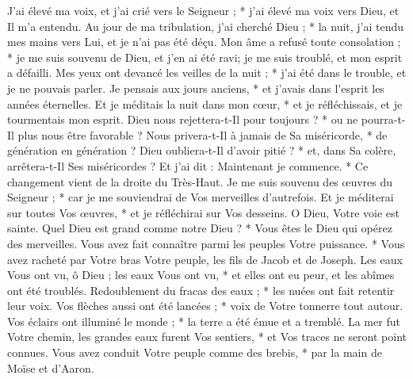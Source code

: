  J'ai élevé ma voix, et j'ai crié vers le Seigneur ; * j'ai élevé ma voix vers Dieu, et Il m'a entendu.
\versseparator
 Au jour de ma tribulation, j'ai cherché Dieu ; * la nuit, j'ai tendu mes mains vers Lui, et je n'ai pas été déçu.
\versseparator
 Mon âme a refusé toute consolation ; * je me suis souvenu de Dieu, et j'en ai été ravi; je me suis troublé, et mon esprit a défailli.
\versseparator
 Mes yeux ont devancé les veilles de la nuit ; * j'ai été dans le trouble, et je ne pouvais parler.
\versseparator
 Je pensais aux jours anciens, * et j'avais dans l'esprit les années éternelles.
\versseparator
 Et je méditais la nuit dans mon cœur, * et je réfléchissais, et je tourmentais mon esprit.
\versseparator
 Dieu nous rejettera-t-Il pour toujours ? * ou ne pourra-t-Il plus nous être favorable ?
\versseparator
 Nous privera-t-Il à jamais de Sa miséricorde, * de génération en génération ?
\versseparator
 Dieu oubliera-t-Il d'avoir pitié ? * et, dans Sa colère, arrêtera-t-Il Ses miséricordes ?
\versseparator
 Et j'ai dit : Maintenant je commence. * Ce changement vient de la droite du Très-Haut.
\versseparator
 Je me suis souvenu des œuvres du Seigneur ; * car je me souviendrai de Vos merveilles d'autrefois.
\versseparator
 Et je méditerai sur toutes Vos œuvres, * et je réfléchirai sur Vos desseins.
\versseparator
 O Dieu, Votre voie est sainte. Quel Dieu est grand comme notre Dieu ? * Vous êtes le Dieu qui opérez des merveilles.
\versseparator
 Vous avez fait connaître parmi les peuples Votre puissance. * Vous avez racheté par Votre bras Votre peuple, les fils de Jacob et de Joseph.
\versseparator
 Les eaux Vous ont vu, ô Dieu ; les eaux Vous ont vu, * et elles ont eu peur, et les abîmes ont été troublés.
\versseparator
 Redoublement du fracas des eaux ; * les nuées ont fait retentir leur voix.
\versseparator
 Vos flèches aussi ont été lancées ; * voix de Votre tonnerre tout autour.
\versseparator
 Vos éclairs ont illuminé le monde ; * la terre a été émue et a tremblé.
\versseparator
 La mer fut Votre chemin, les grandes eaux furent Vos sentiers, * et Vos traces ne seront point connues.
\versseparator
 Vous avez conduit Votre peuple comme des brebis, * par la main de Moïse et d'Aaron.
